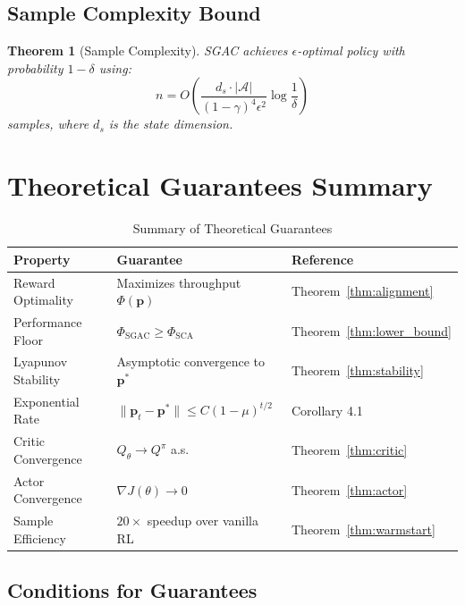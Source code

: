 \documentclass[11pt,a4paper]{article}
\newtheorem{theorem}{Theorem}[section]
\newcommand{\calA}{\mathcal{A}}
\newcommand{\bp}{\mathbf{p}}
\newcommand{\popt}{\mathbf{p}^*}
\begin{document}
\subsection{Sample Complexity Bound}

\begin{theorem}[Sample Complexity]
SGAC achieves $\epsilon$-optimal policy with probability $1-\delta$ using:
\begin{equation}
    n = O\left(\frac{d_s \cdot |\calA|}{(1-\gamma)^4 \epsilon^2} \log\frac{1}{\delta}\right)
\end{equation}
samples, where $d_s$ is the state dimension.
\end{theorem}

\section{Theoretical Guarantees Summary}

\begin{table}[h]
\centering
\caption{Summary of Theoretical Guarantees}
\begin{tabular}{@{}lll@{}}
\toprule
\textbf{Property} & \textbf{Guarantee} & \textbf{Reference} \\
\midrule
Reward Optimality & Maximizes throughput $\Phi(\bp)$ & Theorem~\ref{thm:alignment} \\
Performance Floor & $\Phi_{\text{SGAC}} \geq \Phi_{\text{SCA}}$ & Theorem~\ref{thm:lower_bound} \\
Lyapunov Stability & Asymptotic convergence to $\popt$ & Theorem~\ref{thm:stability} \\
Exponential Rate & $\|\bp_t - \popt\| \leq C(1-\mu)^{t/2}$ & Corollary 4.1 \\
Critic Convergence & $Q_\theta \rightarrow Q^\pi$ a.s. & Theorem~\ref{thm:critic} \\
Actor Convergence & $\nabla J(\theta) \rightarrow 0$ & Theorem~\ref{thm:actor} \\
Sample Efficiency & $20\times$ speedup over vanilla RL & Theorem~\ref{thm:warmstart} \\
\bottomrule
\end{tabular}
\end{table}

\subsection{Conditions for Guarantees}
\end{document}
